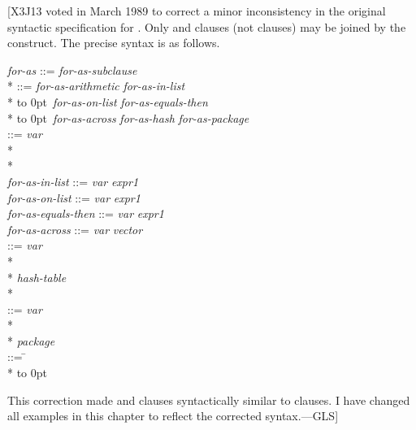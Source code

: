 [X3J13 voted in March 1989  to correct a minor
inconsistency in the original syntactic specification for .  Only 
and  clauses (not  clauses) may be joined by the  construct. The
precise syntax is as follows.
\begin{tabbing}
{\it for-as\/} ::=  {\it for-as-subclause\/}  \\*
 ::= \={\it for-as-arithmetic\/} {\Mor} {\it for-as-in-list\/} \\*
\>\hbox to 0pt{\hss\Mor~}{\it for-as-on-list\/} {\Mor} {\it for-as-equals-then\/}  \\*
\>\hbox to 0pt{\hss\Mor~}{\it for-as-across\/} {\Mor} {\it for-as-hash\/} {\Mor} {\it for-as-package\/} \poptabs \\
 ::= \={\it var\/}   \\*
\> \\*
\> \poptabs \\
{\it for-as-in-list\/} ::= {\it var\/}   {\it expr1\/}  \\
{\it for-as-on-list\/} ::= {\it var\/}   {\it expr1\/}  \\
{\it for-as-equals-then\/} ::= {\it var\/}  \cd{=} {\it expr1\/}  \\
{\it for-as-across\/} ::= {\it var\/}   {\it vector\/} \\
 ::= \={\it var\/}    \\*
\> \\*
\> {\it hash-table\/} \\*
\> \poptabs \\
 ::= \={\it var\/}    \\*
 \\*
\> {\it package\/} \poptabs \\
 ::= \= {\Mor}  {\Mor}  \\*
\>\hbox to 0pt{\hss\Mor~} {\Mor}  {\Mor}  \poptabs
\end{tabbing}
This correction made  and  clauses syntactically
similar to  clauses.  I have changed all examples in this
chapter to reflect the corrected syntax.---GLS]

